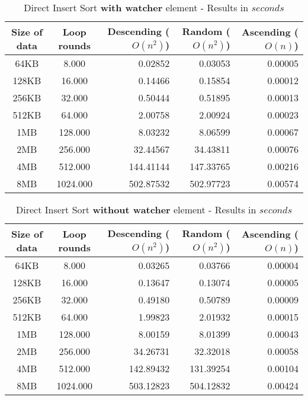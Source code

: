 \documentclass[11pt]{amsart}
\begin{document}
\begin{table}[htdp]
	\caption{Direct Insert Sort \textbf{with watcher} element - Results in $seconds$}
	\begin{tabular}{|c|c|r|r|r|} \hline
		Size of data & Loop rounds & Descending ($O(n^2)$) & Random ($O(n^2)$) & Ascending ($O(n)$) \\ \hline
		64KB & 8.000 & 0.02852 & 0.03053 & 0.00005 \\ \hline
		128KB & 16.000 & 0.14466 & 0.15854 & 0.00012 \\ \hline
		256KB & 32.000& 0.50444 & 0.51895 & 0.00013 \\ \hline
		512KB & 64.000 & 2.00758 & 2.00924 & 0.00023 \\ \hline
		1MB & 128.000 & 8.03232 & 8.06599 & 0.00067 \\ \hline
		2MB & 256.000 & 32.44567 & 34.43811 & 0.00076 \\ \hline
		4MB & 512.000 & 144.41144 & 147.33765 & 0.00216 \\ \hline
		8MB & 1024.000 & 502.87532 & 502.97723 & 0.00574 \\ \hline
	\end{tabular}
	\label{default}
\end{table}%

\begin{table}[htdp]
	\caption{Direct Insert Sort \textbf{without watcher} element - Results in $seconds$}
	\begin{tabular}{|c|c|r|r|r|} \hline
		Size of data & Loop rounds & Descending ($O(n^2)$) & Random ($O(n^2)$) & Ascending ($O(n)$) \\ \hline
		64KB & 8.000 & 0.03265 & 0.03766 & 0.00004 \\ \hline
		128KB & 16.000 & 0.13647 & 0.13074 & 0.00005 \\ \hline
		256KB & 32.000& 0.49180 & 0.50789 & 0.00009 \\ \hline
		512KB & 64.000 & 1.99823 & 2.01932 & 0.00015 \\ \hline
		1MB & 128.000 & 8.00159 & 8.01399 & 0.00043 \\ \hline
		2MB & 256.000 & 34.26731 & 32.32018 & 0.00058 \\ \hline
		4MB & 512.000 & 142.89432 & 131.39254 & 0.00104 \\ \hline
		8MB & 1024.000 & 503.12823 & 504.12832 & 0.00424 \\ \hline
	\end{tabular}
	\label{default}
\end{table}%
\end{document}
